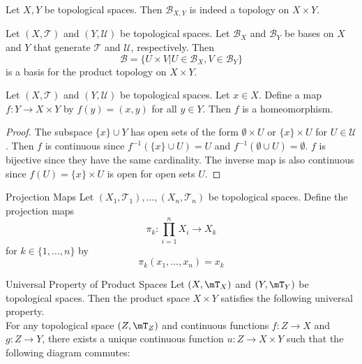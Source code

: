 \documentclass[a4paper]{article}
\begin{document}
\begin{lmm}{}{} Let $X,Y$ be topological spaces. Then $\mathcal{B}_{X,Y}$ is indeed a topology on $X\times Y$. 
\end{lmm}

\begin{prp}{}{} Let $(X,\mathcal{T})$ and $(Y,\mathcal{U})$ be topological spaces. Let $\mathcal{B}_X$ and $\mathcal{B}_Y$ be bases on $X$ and $Y$ that generate $\mathcal{T}$ and $\mathcal{U}$, respectively. Then $$\mathcal{B}=\{U\times V|U\in\mathcal{B}_X, V\in\mathcal{B}_Y\}$$ is a basis for the product topology on $X\times Y$. 
\end{prp}

\begin{prp}{}{} Let $(X,\mathcal{T})$ and $(Y,\mathcal{U})$ be topological spaces. Let $x\in X$. Define a map $f:Y\to X\times Y$ by $f(y)=(x,y)$ for all $y\in Y$. Then $f$ is a homeomorphism. 
\begin{proof}
The subspace $\{x\}\cup Y$ has open sets of the form $\emptyset\times U$ or $\{x\}\times U$ for $U\in\mathcal{U}$. Then $f$ is continuous since $f^{-1}(\{x\}\cup U)=U$ and $f^{-1}(\emptyset\cup U)=\emptyset$. $f$ is bijective since they have the same cardinality. The inverse map is also continuous since $f(U)=\{x\}\times U$ is open for open sets $U$. 
\end{proof}
\end{prp}

\begin{defn}{Projection Maps}{} Let $(X_1,\mathcal{T}_1),\dots,(X_n,\mathcal{T}_n)$ be topological spaces. Define the projection maps $$\pi_k:\prod_{i=1}^nX_i\to X_k$$ for $k\in\{1,\dots,n\}$ by $$\pi_k(x_1,\dots,x_n)=x_k$$
\end{defn}

\begin{prp}{Universal Property of Product Spaces}{} Let $(X,\mT_X)$ and $(Y,\mT_Y)$ be topological spaces. Then the product space $X\times Y$ satisfies the following universal property. \\

For any topological space $(Z,\mT_Z)$ and continuous functions $f:Z\to X$ and $g:Z\to Y$, there exists a unique continuous function $u:Z\to X\times Y$ such that the following diagram commutes: \\
 \\
\end{prp}
\end{document}
